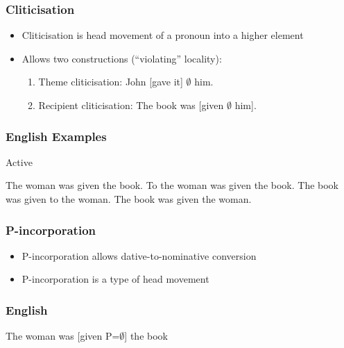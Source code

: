 \documentclass{beamer}
\begin{document}
\begin{frame}
	\frametitle{Cliticisation}
	\begin{itemize}
		\item Cliticisation is head movement of a pronoun into a higher element
		\item Allows two constructions (``violating'' locality):
		\begin{enumerate}
			\item Theme cliticisation: John [gave it] $\emptyset$ him.
			\item Recipient cliticisation: The book was [given $\emptyset$ him].
		\end{enumerate}
	\end{itemize}
\end{frame}

\begin{frame}
	\frametitle{English Examples}
\begin{exe}
	\ex Active
	\begin{xlist}
		\ex The woman was given the book.
		\ex To the woman was given the book.
		\ex The book was given to the woman.
		\ex The book was given the woman.
	\end{xlist}
\end{exe}
\end{frame}

\begin{frame}
	\frametitle{P-incorporation}
	\begin{itemize}
		\item P-incorporation allows dative-to-nominative conversion \citep{Alexiadou.2014}
		\item P-incorporation is a type of head movement
	\end{itemize}
 \end{frame}

 \begin{frame}
	\frametitle{English}
	\vfill
	The woman was [given P=$\emptyset$] the book
	\vfill
\end{frame}
\end{document}
